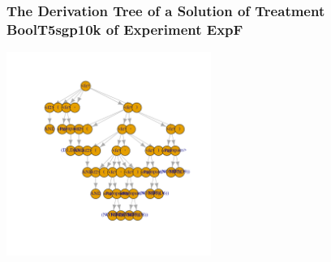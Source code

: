  \begin{frame}
 \frametitle{ The Derivation Tree of a Solution of Treatment BoolT5sgp10k of Experiment ExpF }
 \begin{center}
\includegraphics[width=0.5\textwidth, angle=0]
{ExpFDerivationTreeFigure000.pdf}
 \end{center}
 \label{report/ExpFDerivationTreeFigure000.pdf}  
 \end{frame}

